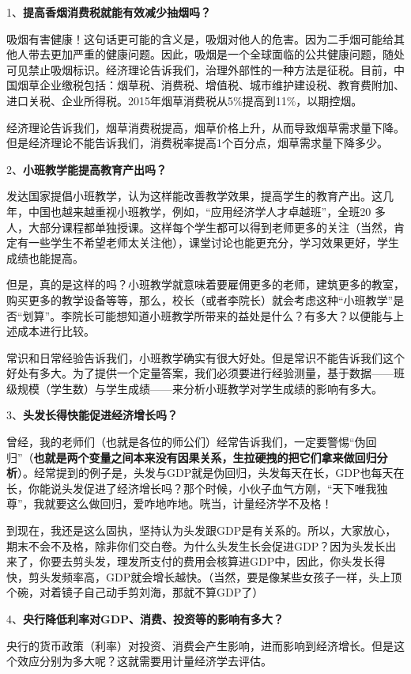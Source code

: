\documentclass[cn,12pt,math=newtx,citestyle=gb7714-2015,bibstyle=gb7714-2015]{elegantbook}
\begin{document}
	1、\textbf{提高香烟消费税就能有效减少抽烟吗？}
	
	吸烟有害健康！这句话更可能的含义是，吸烟对他人的危害。因为二手烟可能给其他人带去更加严重的健康问题。因此，吸烟是一个全球面临的公共健康问题，随处可见禁止吸烟标识。经济理论告诉我们，治理外部性的一种方法是征税。目前，中国烟草企业缴税包括：烟草税、消费税、增值税、城市维护建设税、教育费附加、进口关税、企业所得税。2015年烟草消费税从5\%提高到11\%，以期控烟。
	
	经济理论告诉我们，烟草消费税提高，烟草价格上升，从而导致烟草需求量下降。但是经济理论不能告诉我们，消费税率提高1个百分点，烟草需求量下降多少。
	
	2、\textbf{小班教学能提高教育产出吗？}
	
	发达国家提倡小班教学，认为这样能改善教学效果，提高学生的教育产出。这几年，中国也越来越重视小班教学，例如，“应用经济学人才卓越班”，全班20 多人，大部分课程都单独授课。这样每个学生都可以得到老师更多的关注（当然，肯定有一些学生不希望老师太关注他），课堂讨论也能更充分，学习效果更好，学生成绩也能提高。
	
	但是，真的是这样的吗？小班教学就意味着要雇佣更多的老师，建筑更多的教室，购买更多的教学设备等等，那么，校长（或者李院长）就会考虑这种“小班教学”是否“划算”。李院长可能想知道小班教学所带来的益处是什么？有多大？以便能与上述成本进行比较。
	
	常识和日常经验告诉我们，小班教学确实有很大好处。但是常识不能告诉我们这个好处有多大。为了提供一个定量答案，我们必须要进行经验测量，基于数据——班级规模（学生数）与学生成绩——来分析小班教学对学生成绩的影响有多大。
	
	3、\textbf{头发长得快能促进经济增长吗？}
	
	曾经，我的老师们（也就是各位的师公们）经常告诉我们，一定要警惕“伪回归”（\textbf{也就是两个变量之间本来没有因果关系，生拉硬拽的把它们拿来做回归分析}）。经常提到的例子是，头发与GDP就是伪回归，头发每天在长，GDP也每天在长，你能说头发促进了经济增长吗？那个时候，小伙子血气方刚，“天下唯我独尊”，我就要这么做回归，爱咋地咋地。咣当，计量经济学不及格！
	
	到现在，我还是这么固执，坚持认为头发跟GDP是有关系的。所以，大家放心，期末不会不及格，除非你们交白卷。为什么头发生长会促进GDP？因为头发长出来了，你要去剪头发，理发所支付的费用会核算进GDP中，因此，你头发长得快，剪头发频率高，GDP就会增长越快。（当然，要是像某些女孩子一样，头上顶个碗，对着镜子自己动手剪刘海，那就不算GDP了）
	
	4、\textbf{央行降低利率对GDP、消费、投资等的影响有多大？}
	
	央行的货币政策（利率）对投资、消费会产生影响，进而影响到经济增长。但是这个效应分别为多大呢？这就需要用计量经济学去评估。
	
\end{document}
